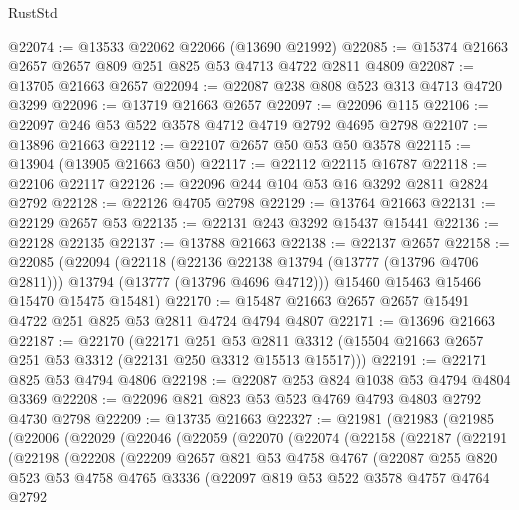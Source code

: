 \begin{lexlean}{RustStd}
\begin{coremodule}
@22074 := @13533 @22062 @22066 (@13690 @21992)
@22085 := @15374 @21663 @2657 @2657 @809 @251 @825 @53 @4713 @4722 @2811 @4809
@22087 := @13705 @21663 @2657
@22094 := @22087 @238 @808 @523 @313 @4713 @4720 @3299
@22096 := @13719 @21663 @2657
@22097 := @22096 @115
@22106 := @22097 @246 @53 @522 @3578 @4712 @4719 @2792 @4695 @2798
@22107 := @13896 @21663
@22112 := @22107 @2657 @50 @53 @50 @3578
@22115 := @13904 (@13905 @21663 @50)
@22117 := @22112 @22115 @16787
@22118 := @22106 @22117
@22126 := @22096 @244 @104 @53 @16 @3292 @2811 @2824 @2792
@22128 := @22126 @4705 @2798
@22129 := @13764 @21663
@22131 := @22129 @2657 @53
@22135 := @22131 @243 @3292 @15437 @15441
@22136 := @22128 @22135
@22137 := @13788 @21663
@22138 := @22137 @2657
@22158 := @22085
    (@22094
      (@22118
        (@22136 @22138 @13794 (@13777 (@13796 @4706 @2811)))
        @13794
        (@13777 (@13796 @4696 @4712)))
      @15460
      @15463
      @15466
      @15470
      @15475
      @15481)
@22170 := @15487 @21663 @2657 @2657 @15491 @4722 @251 @825 @53 @2811 @4724 @4794 @4807
@22171 := @13696 @21663
@22187 := @22170
    (@22171
      @251
      @53
      @2811
      @3312
      (@15504 @21663 @2657 @251 @53 @3312 (@22131 @250 @3312 @15513 @15517)))
@22191 := @22171 @825 @53 @4794 @4806
@22198 := @22087 @253 @824 @1038 @53 @4794 @4804 @3369
@22208 := @22096 @821 @823 @53 @523 @4769 @4793 @4803 @2792 @4730 @2798
@22209 := @13735 @21663
@22327 := @21981
    (@21983
      (@21985
        (@22006
          (@22029
            (@22046
              (@22059
                (@22070
                  (@22074
                    (@22158
                      (@22187
                        (@22191
                          (@22198
                            (@22208
                              (@22209
                                @2657
                                @821
                                @53
                                @4758
                                @4767
                                (@22087
                                  @255
                                  @820
                                  @523
                                  @53
                                  @4758
                                  @4765
                                  @3336
                                  (@22097
                                    @819
                                    @53
                                    @522
                                    @3578
                                    @4757
                                    @4764
                                    @2792

\end{coremodule}
\end{lexlean}
